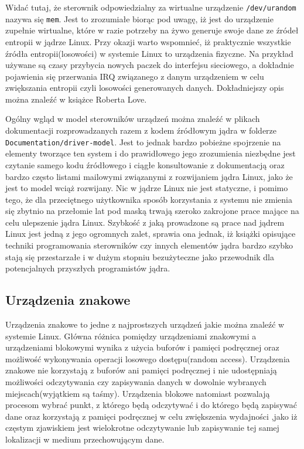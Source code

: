 \documentclass[10pt]{article}
\begin{document}
Widać tutaj, że sterownik odpowiedzialny za wirtualne urządzenie \texttt{/dev/urandom} nazywa się \texttt{mem}. Jest to zrozumiałe biorąc pod uwagę, iż jest do urządzenie zupełnie wirtualne, które w razie potrzeby na żywo generuje swoje dane ze źródeł entropii w jądrze Linux.  Przy okazji warto wspomnieć, iż praktycznie wszystkie źródła entropii(losowości) w systemie Linux to urządzenia fizyczne. Na przykład używane są czasy przybycia nowych paczek do interfejsu sieciowego, a dokładnie pojawienia się przerwania IRQ związanego z danym urządzeniem w celu zwiększania entropii czyli losowości generowanych danych.  Dokładniejszy opis można znaleźć w książce Roberta Love\cite{linuxkerneldevel}.

Ogólny wgląd w model sterowników urządzeń można znaleźć w plikach dokumentacji rozprowadzanych razem z kodem źródłowym jądra w folderze \texttt{Documentation/driver-model}. Jest to jednak bardzo pobieżne spojrzenie na elementy tworzące ten system i do prawidłowego jego zrozumienia niezbędne jest czytanie samego kodu źródłowego i ciągłe konsultowanie z dokumentacją oraz bardzo często listami mailowymi związanymi z rozwijaniem jądra Linux, jako że jest to model wciąż rozwijany. Nic w jądrze Linux nie jest statyczne, i pomimo tego, że dla przeciętnego użytkownika sposób korzystania z systemu nie zmienia się zbytnio na przełomie lat pod maską trwają szeroko zakrojone prace mające na celu ulepszenie jądra Linux. Szybkość z jaką prowadzone są prace nad jądrem Linux jest jedną z jego ogromnych zalet, sprawia ona jednak, iż książki opisujące techniki programowania sterowników czy innych elementów jądra bardzo szybko stają się przestarzałe i w dużym stopniu bezużyteczne jako przewodnik dla potencjalnych przyszłych programistów jądra.

\subsection{Urządzenia znakowe}
\label{chardevs}

Urządzenia znakowe to jedne z najprostszych urządzeń jakie można znaleźć w systemie Linux. Główna różnica pomiędzy urządzeniami znakowymi a urządzeniami blokowymi wynika z użycia buforów i pamięci podręcznej oraz możliwość wykonywania operacji losowego dostępu(random access).  Urządzenia znakowe nie korzystają z buforów ani pamięci podręcznej i nie udostępniają możliwości odczytywania czy zapisywania danych w dowolnie wybranych miejscach(wyjątkiem są taśmy). Urządzenia blokowe natomiast pozwalają procesom wybrać punkt, z którego będą odczytywać i do którego będą zapisywać dane oraz korzystają z pamięci podręcznej w celu zwiększenia wydajności ,jako iż częstym zjawiskiem jest wielokrotne odczytywanie lub zapisywanie tej samej lokalizacji w medium przechowującym dane.
\end{document}
